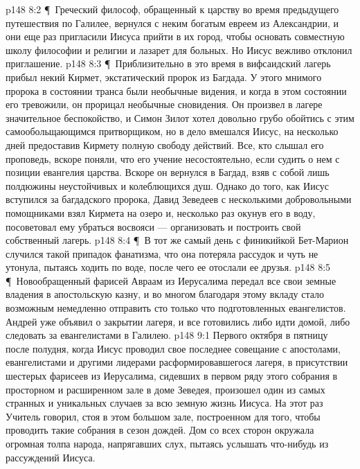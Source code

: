 \vs p148 8:2 \P\ Греческий философ, обращенный к царству во время предыдущего путешествия по Галилее, вернулся с неким богатым евреем из Александрии, и они еще раз пригласили Иисуса прийти в их город, чтобы основать совместную школу философии и религии и лазарет для больных. Но Иисус вежливо отклонил приглашение.
\vs p148 8:3 \P\ Приблизительно в это время в вифсаидский лагерь прибыл некий Кирмет, экстатический пророк из Багдада. У этого мнимого пророка в состоянии транса были необычные видения, и когда в этом состоянии его тревожили, он прорицал необычные сновидения. Он произвел в лагере значительное беспокойство, и Симон Зилот хотел довольно грубо обойтись с этим самообольщающимся притворщиком, но в дело вмешался Иисус, на несколько дней предоставив Кирмету полную свободу действий. Все, кто слышал его проповедь, вскоре поняли, что его учение несостоятельно, если судить о нем с позиции евангелия царства. Вскоре он вернулся в Багдад, взяв с собой лишь полдюжины неустойчивых и колеблющихся душ. Однако до того, как Иисус вступился за багдадского пророка, Давид Зеведеев с несколькими добровольными помощниками взял Кирмета на озеро и, несколько раз окунув его в воду, посоветовал ему убраться восвояси --- организовать и построить свой собственный лагерь.
\vs p148 8:4 \P\ В тот же самый день с финикийкой Бет\hyp{}Марион случился такой припадок фанатизма, что она потеряла рассудок и чуть не утонула, пытаясь ходить по воде, после чего ее отослали ее друзья.
\vs p148 8:5 \P\ Новообращенный фарисей Авраам из Иерусалима передал все свои земные владения в апостольскую казну, и во многом благодаря этому вкладу стало возможным немедленно отправить сто только что подготовленных евангелистов. Андрей уже объявил о закрытии лагеря, и все готовились либо идти домой, либо следовать за евангелистами в Галилею.
\vs p148 9:1 Первого октября в пятницу после полудня, когда Иисус проводил свое последнее совещание с апостолами, евангелистами и другими лидерами расформировавшегося лагеря, в присутствии шестерых фарисеев из Иерусалима, сидевших в первом ряду этого собрания в просторном и расширенном зале в доме Зеведея, произошел один из самых странных и уникальных случаев за всю земную жизнь Иисуса. На этот раз Учитель говорил, стоя в этом большом зале, построенном для того, чтобы проводить такие собрания в сезон дождей. Дом со всех сторон окружала огромная толпа народа, напрягавших слух, пытаясь услышать что\hyp{}нибудь из рассуждений Иисуса.

